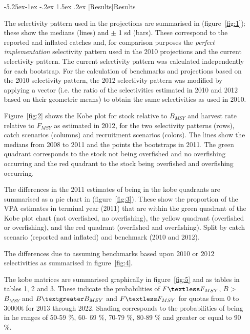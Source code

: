 \documentclass[a4paper, 10pt]{article}
\makeatletter
\renewcommand{\section}{\@startsection{section}{1}{\z@}%
  {-5.25ex\@plus -1ex \@minus -.2ex}%
  {1.5ex \@plus .2ex}%
  {\normalfont\bfseries}}
\makeatother
\begin{document}
\section[Results]{Results}

The selectivity pattern used in the projections are summarised in (figure~\ref{fig:1}); these show the medians (lines) 
and $\pm$ 1 sd (bars). These correspond to the reported and inflated catches and, for comparison purposes 
the \emph{perfect implementation} selectivity pattern used in the 2010 projections and the current selectivity pattern. The current 
selectivity pattern was calculated independently for each bootstrap. 
For the calculation of benchmarks and projections based on the 2010 selectivity pattern, the 2012 selectivity
pattern was modified by applying a vector (i.e. the ratio of the selectivities estimated in 2010 and 2012 based on their 
geometric means) to obtain the same selectivities as used in 2010.


Figure~\ref{fig:2} shows the Kobe plot for stock relative to $B_{MSY}$ and harvest
rate relative to $F_{MSY}$ as estimated in 2012, for the two selectivity patterns (rows), catch scenarios 
(columns) and recruitment scenarios (colors). The lines show the medians from 2008 to 2011 and the 
points the bootstraps in 2011. The green quadrant corresponds to the stock not being overfished and no overfishing occurring and 
the red quadrant to the stock being overfished and overfishing occurring.

The differences in the 2011 estimates of being in the kobe quadrants are summarised as a pie chart in (figure~\ref{fig:3}). 
These show the proportion of the VPA estimates in 
terminal year (2011) that are within the green quadrant of the Kobe plot chart (not overfished, no overfishing), 
the yellow quadrant (overfished or overfishing), and the red quadrant (overfished and overfishing). 
Split by catch scenario (reported and inflated) and benchmark (2010 and 2012).

The differences due to assuming benchmarks based upon 2010 or 2012 selectivities as summarised in figure~\ref{fig:4}.

The kobe matrices are summarised graphically in figure~\ref{fig:5} and as tables in
tables 1, 2 and 3. These indicate the probabilities of  $F \textless F_{MSY}$, $B$ \textgreater $B_{MSY}$ and $B \textgreater B_{MSY}$ and 
$F \textless F_{MSY}$ for quotas from 0 to 30000t for 2013 through 2022.
Shading corresponds to the probabilities of being in he ranges of 50-59 \%, 60- 69 \%, 70-79 \%, 80-89 \% and greater or equal to 90 \%.
\end{document}
